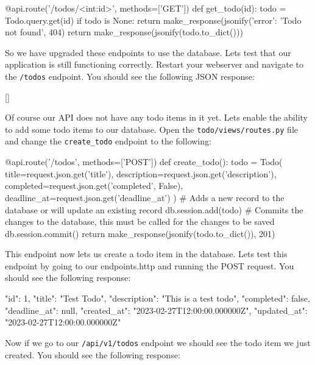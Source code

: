 \documentclass{csse4400}
\begin{document}
\begin{code}[language=python,numbers=none]{}
  @api.route('/todos/<int:id>', methods=['GET'])
  def get_todo(id):
      todo = Todo.query.get(id)
      if todo is None:
          return make_response(jsonify({'error': 'Todo not found'}, 404)
      return make_response(jsonify(todo.to_dict()))
\end{code}

So we have upgraded these endpoints to use the database. Lets test that our application is still functioning correctly. Restart your webserver and navigate to the \texttt{/todos} endpoint. You should see the following JSON response:

\begin{code}[language=json,numbers=none]{}
  []
\end{code}

Of course our API does not have any todo items in it yet. Lets enable the ability to add some todo items to our database. Open the \texttt{todo/views/routes.py} file and change the \texttt{create\_todo} endpoint to the following:

\begin{code}[language=python,numbers=none]{}
  @api.route('/todos', methods=['POST'])
  def create_todo():
      todo = Todo(
          title=request.json.get('title'),
          description=request.json.get('description'),
          completed=request.json.get('completed', False),
          deadline_at=request.json.get('deadline_at')
      )
      # Adds a new record to the database or will update an existing record
      db.session.add(todo)
      # Commits the changes to the database, this must be called for the changes to be saved
      db.session.commit()
      return make_response(jsonify(todo.to_dict()), 201)
\end{code}

This endpoint now lets us create a todo item in the database. Lets test this endpoint by going to our endpoints.http and running the POST request. You should see the following response:

\begin{code}[language=json,numbers=none]{}
  {
    "id": 1,
    "title": "Test Todo",
    "description": "This is a test todo",
    "completed": false,
    "deadline_at": null,
    "created_at": "2023-02-27T12:00:00.000000Z",
    "updated_at": "2023-02-27T12:00:00.000000Z"
  }
\end{code}

Now if we go to our \texttt{/api/v1/todos} endpoint we should see the todo item we just created. You should see the following response:
\end{document}
